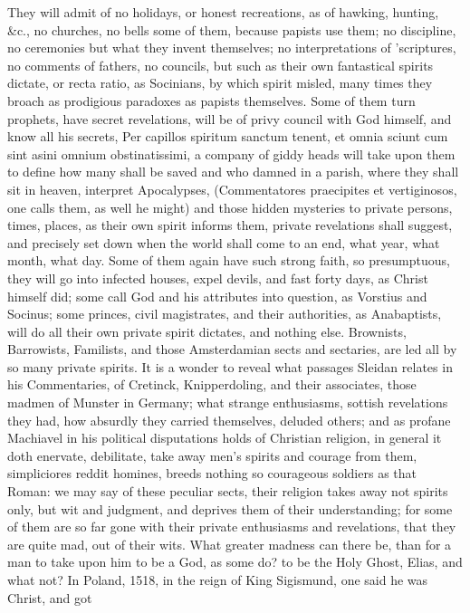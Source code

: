 {They will admit of no holidays, or honest recreations, as of hawking,
hunting, \&c., no churches, no bells some of them, because papists use
them; no discipline, no ceremonies but what they invent themselves; no
interpretations of 'scriptures, no comments of fathers, no councils,
but such as their own fantastical spirits dictate, or recta ratio, as
Socinians, by which spirit misled, many times they broach as prodigious
paradoxes as papists themselves. Some of them turn prophets, have
secret revelations, will be of privy council with God himself, and know
all his secrets,  Per capillos spiritum sanctum tenent, et omnia
sciunt cum sint asini omnium obstinatissimi, a company of giddy heads
will take upon them to define how many shall be saved and who damned in
a parish, where they shall sit in heaven, interpret Apocalypses,
(Commentatores praecipites et vertiginosos, one calls them, as well he
might) and those hidden mysteries to private persons, times, places, as
their own spirit informs them, private revelations shall suggest, and
precisely set down when the world shall come to an end, what year, what
month, what day. Some of them again have such strong faith, so
presumptuous, they will go into infected houses, expel devils, and fast
forty days, as Christ himself did; some call God and his attributes
into question, as Vorstius and Socinus; some princes, civil
magistrates, and their authorities, as Anabaptists, will do all their
own private spirit dictates, and nothing else. Brownists, Barrowists,
Familists, and those Amsterdamian sects and sectaries, are led all by
so many private spirits. It is a wonder to reveal what passages Sleidan
relates in his Commentaries, of Cretinck, Knipperdoling, and their
associates, those madmen of Munster in Germany; what strange
enthusiasms, sottish revelations they had, how absurdly they carried
themselves, deluded others; and as profane Machiavel in his political
disputations holds of Christian religion, in general it doth enervate,
debilitate, take away men's spirits and courage from them, simpliciores
reddit homines, breeds nothing so courageous soldiers as that Roman: we
may say of these peculiar sects, their religion takes away not spirits
only, but wit and judgment, and deprives them of their understanding;
for some of them are so far gone with their private enthusiasms and
revelations, that they are quite mad, out of their wits. What greater
madness can there be, than for a man to take upon him to be a God, as
some do? to be the Holy Ghost, Elias, and what not? In Poland,
1518, in the reign of King Sigismund, one said he was Christ, and got
}
